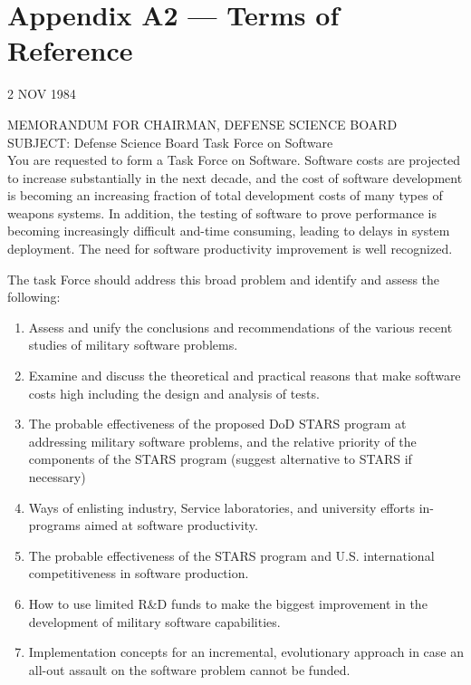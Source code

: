\documentclass[11pt,final]{article}
\begin{document}
\newpage

\section*{Appendix A2 — Terms of Reference}
\begin{flushright}
    2 NOV 1984
\end{flushright}

\noindent
MEMORANDUM FOR CHAIRMAN, DEFENSE SCIENCE BOARD\\

\noindent
SUBJECT: Defense Science Board Task Force on Software\\

You are requested to form a Task Force on Software.  Software costs are
projected to increase substantially in the next decade, and the cost of
software development is becoming an increasing fraction of total development
costs of many types of weapons systems. In addition, the testing of software to
prove performance is becoming increasingly difficult and-time consuming,
leading to delays in system deployment. The need for software productivity
improvement is well recognized.

The task Force should address this broad problem and
identify and assess the following:

\renewcommand{\labelenumi}{\Alph{enumi}.}
\begin{enumerate}
    \item Assess and unify the conclusions and recommendations of the various
        recent studies of military software problems.
    \item Examine and discuss the theoretical and practical reasons that make
        software costs high including the design and analysis of tests.
    \item The probable effectiveness of the proposed DoD STARS program at
        addressing military software problems, and the relative priority of the
        components of the STARS program (suggest alternative to STARS if
        necessary)
    \item Ways of enlisting industry, Service laboratories, and university
        efforts in-programs aimed at software productivity.
    \item The probable effectiveness of the STARS program and U.S. international
        competitiveness in software production.
    \item How to use limited R\&D funds to make the biggest improvement in the
        development of military software capabilities.
    \item Implementation concepts for an incremental, evolutionary approach in
        case an all-out assault on the software problem cannot be funded.
\end{enumerate}
\end{document}
